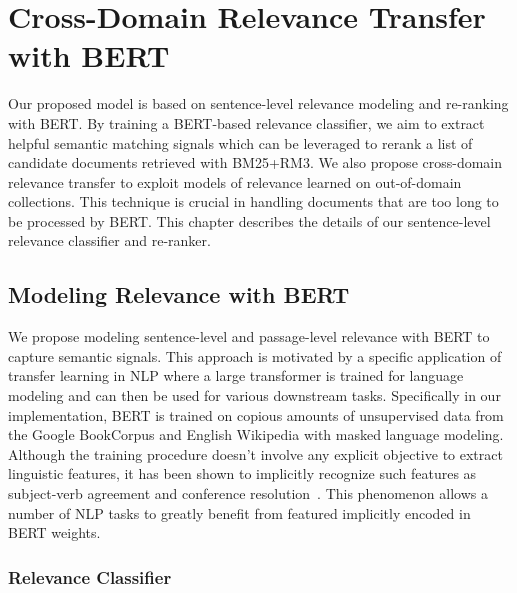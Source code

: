 \chapter{Cross-Domain Relevance Transfer with BERT}
\label{ch:model}


Our proposed model is based on sentence-level relevance modeling and re-ranking with BERT.
By training a BERT-based relevance classifier, we aim to extract helpful semantic matching signals which can be leveraged to rerank a list of candidate documents retrieved with BM25+RM3.
We also propose cross-domain relevance transfer to exploit models of relevance learned on out-of-domain collections.
This technique is crucial in handling documents that are too long to be processed by BERT.
This chapter describes the details of our sentence-level relevance classifier and re-ranker.

\section{Modeling Relevance with BERT}

We propose modeling sentence-level and passage-level relevance with BERT to capture semantic signals.
This approach is motivated by a specific application of transfer learning in NLP where a large transformer is trained for language modeling and can then be used for various downstream tasks.
Specifically in our implementation, BERT is trained on copious amounts of unsupervised data from the Google BookCorpus and English Wikipedia with masked language modeling.
Although the training procedure doesn't involve any explicit objective to extract linguistic features, it has been shown to implicitly recognize such features as subject-verb agreement and conference resolution~\cite{jawahar2019does, clark2019does}.
This phenomenon allows a number of NLP tasks to greatly benefit from featured implicitly encoded in BERT weights.

\subsection{Relevance Classifier}

